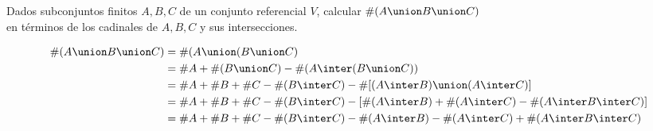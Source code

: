 \ejercicio

Dados subconjuntos finitos $A, B, C$ de un conjunto referencial $V$, calcular $\#(A \union B \union C)$\\
en términos de los cadinales de $A, B, C$ y sus intersecciones.

\begin{align*}
    \#(A \union B \union C) &= \#(A \union (B \union C)\\
    &= \#A + \#(B \union C) - \#(A \inter (B \union C))\\
    &= \#A + \#B + \#C - \#(B \inter C) - \#[(A \inter B) \union (A \inter C)]\\
    &= \#A + \#B + \#C - \#(B \inter C) - [\#(A \inter B) + \#(A \inter C) - \#(A \inter B \inter C)]\\
    & = \#A + \#B + \#C - \#(B \inter C) - \#(A \inter B) - \#(A \inter C) + \#(A \inter B \inter C)
\end{align*}